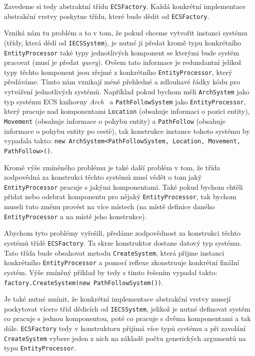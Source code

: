 Zavedeme si tedy abstraktní třídu \verb|ECSFactory|. Každá konkrétní implementace abstrakční vrstvy poskytne třídu, které bude dědit od \verb|ECSFactory|.

Vzniká nám tu problém a to v tom, že pokud chceme vytvořit instanci systému (třídy, která dědí od \verb|IECSSystem|), je nutné ji předat kromě typu konkrétního \verb|EntityProcessor| také typy jednotlivých komponent se kterými bude systém pracovat (musí je předat \textit{query}). Ovšem tato informace je redundantní jelikož typy těchto komponent jsou zřejmé z konkrétního \verb|EntityProcessor|, který předáváme. Tímto nám vznikají méně přehledné a zdlouhavé řádky kódu pro vytváření jednotlivých systémů. Například pokud bychom měli \verb|ArchSystem| jako typ systému ECS knihovny \textit{Arch}~\cite{Arch} a \verb|PathFollowSystem| jako \verb|EntityProcessor|, který pracuje nad komponentami \verb|Location| (obsahuje informaci o pozici entity), \verb|Movement| (obsahuje informace o pohybu entity) a \verb|PathFollow| (obsahuje informace o pohybu entity po cestě), tak konstrukce instance tohoto systému by vypadala takto: \texttt{new ArchSystem<PathFollowSystem, Location, Movement, PathFollow>()}.

Kromě výše zmíněného problému je také další problém v tom, že třída zodpovědná za konstrukci těchto systémů musí vědět o tom jaký \verb|EntityProcessor| pracuje s jakými komponentami. Také pokud bychom chtěli přidat nebo odebrat komponentu pro nějaký \verb|EntityProcessor|, tak bychom museli tuto změnu provést na více místech (na místě definice daného \verb|EntityProcessor| a na místě jeho konstrukce).

Abychom tyto problémy vyřešili, předáme zodpovědnost za konstrukci těchto systémů třídě \verb|ECSFactory|. Ta skrze konstruktor dostane datový typ systému. Tato třída bude obsahovat metodu \verb|CreateSystem|, která přijme instanci konkrétního \verb|EntityProcessor| a pomocí reflexe zkonstruuje konkrétní finální systém. Výše zmíněný příklad by tedy s tímto řešením vypadal takto: \verb|factory.CreateSystem(new PathFollowSystem())|.

Je také nutné zmínit, že konkrétní implementace abstrakční vrstvy musejí poskytovat vícero tříd dědicích od \verb|IECSSystem|, jelikož je nutné definovat systém co pracuje s jednou komponentou, poté co pracuje s dvěma komponentami a tak dále. \verb|ECSFactory| tedy v konstruktoru přijímá více typů systému a při zavolání \verb|CreateSystem| vybere jeden z nich na základě počtu generických argumentů na typu \verb|EntityProcessor|.

